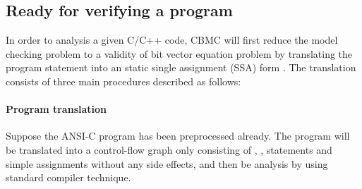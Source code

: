 \subsection{Ready for verifying a program}
In order to analysis a given C/C++ code, CBMC will first reduce the model checking problem to a validity of bit vector equation problem by translating the program statement into an static single assignment (SSA) form \cite{ckl2004, Clarke:2003:HVU:1119772.1119831}. The translation consists of three main procedures described as follows: 

\paragraph{Program translation} Suppose the ANSI-C program has been preprocessed already. The program will be translated into a control-flow graph only consisting of , ,  statements and simple assignments without any side effects, and then be analysis by using standard compiler technique.


